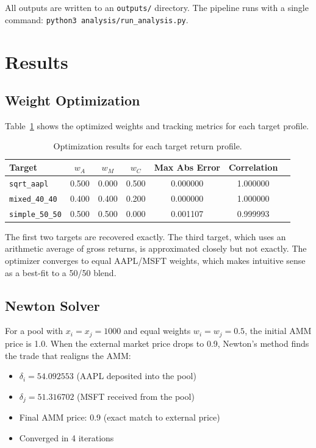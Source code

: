 \documentclass[12pt]{article}
\begin{document}
All outputs are written to an \texttt{outputs/} directory. The pipeline runs with a single command: \texttt{python3 analysis/run\_analysis.py}.

\section{Results}

\subsection*{Weight Optimization}

Table~\ref{tab:opt} shows the optimized weights and tracking metrics for each target profile.

\begin{table}[H]
\centering
\caption{Optimization results for each target return profile.}
\label{tab:opt}
\begin{tabular}{lcccccc}
\toprule
Target & $w_A$ & $w_M$ & $w_C$ & Max Abs Error & Correlation \\
\midrule
\texttt{sqrt\_aapl}    & 0.500 & 0.000 & 0.500 & 0.000000 & 1.000000 \\
\texttt{mixed\_40\_40} & 0.400 & 0.400 & 0.200 & 0.000000 & 1.000000 \\
\texttt{simple\_50\_50}& 0.500 & 0.500 & 0.000 & 0.001107 & 0.999993 \\
\bottomrule
\end{tabular}
\end{table}

The first two targets are recovered exactly. The third target, which uses an arithmetic average of gross returns, is approximated closely but not exactly. The optimizer converges to equal AAPL/MSFT weights, which makes intuitive sense as a best-fit to a 50/50 blend.

\subsection*{Newton Solver}

For a pool with $x_i = x_j = 1000$ and equal weights $w_i = w_j = 0.5$, the initial AMM price is 1.0. When the external market price drops to 0.9, Newton's method finds the trade that realigns the AMM:

\begin{itemize}
    \item $\delta_i = 54.092553$ (AAPL deposited into the pool)
    \item $\delta_j = 51.316702$ (MSFT received from the pool)
    \item Final AMM price: 0.9 (exact match to external price)
    \item Converged in 4 iterations
\end{itemize}
\end{document}
